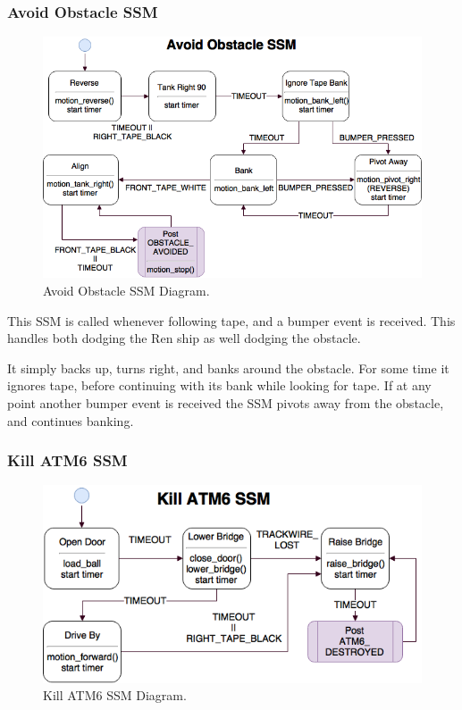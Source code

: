 \documentclass[]{article}
\begin{document}
\subsubsection{Avoid Obstacle SSM}
\begin{figure}[H]
    \centering
    \includegraphics[scale=0.60]{avoid-obstacle-ssm.png}
    \caption{Avoid Obstacle SSM Diagram.}
    \label{fig: avoid obstacle ssm}
\end{figure}

This SSM is called whenever following tape, and a bumper event is received. This handles both dodging the Ren ship as well dodging the obstacle.

It simply backs up, turns right, and banks around the obstacle. For some time it ignores tape, before continuing with its bank while looking for tape. If at any point another bumper event is received the SSM pivots away from the obstacle, and continues banking.

\subsubsection{Kill ATM6 SSM}
\begin{figure}[H]
    \centering
    \includegraphics[scale=0.60]{kill-atm6-ssm.png}
    \caption{Kill ATM6 SSM Diagram.}
    \label{fig: kill ATM6 ssm}
\end{figure}
\end{document}
